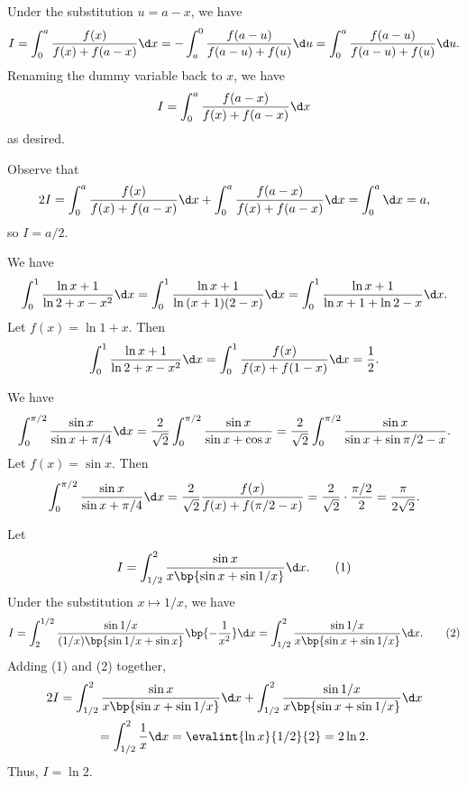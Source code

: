 \begin{solution}
    \begin{ppart}
        Under the substitution $u = a - x$, we have \[I = \int_0^a \frac{f(x)}{f(x) + f(a-x)} \d x = -\int_a^0 \frac{f(a-u)}{f(a-u) + f(u)} \d u = \int_0^a \frac{f(a-u)}{f(a-u) + f(u)} \d u.\] Renaming the dummy variable back to $x$, we have \[I = \int_0^a \frac{f(a - x)}{f(x) + f(a-x)} \d x\] as desired.

        Observe that \[2I = \int_0^a \frac{f(x)}{f(x) + f(a-x)} \d x + \int_0^a \frac{f(a - x)}{f(x) + f(a-x)} \d x = \int_0^a \d x = a,\] so $I = a/2$.

        We have \[\int_0^1 \frac{\ln{x+1}}{\ln{2 + x - x^2}} \d x = \int_0^1 \frac{\ln{x+1}}{\ln{(x+1)(2-x)}} \d x = \int_0^1 \frac{\ln{x+1}}{\ln{x+1} + \ln{2-x}} \d x.\] Let $f(x) = \ln{1+x}$. Then \[\int_0^1 \frac{\ln{x+1}}{\ln{2 + x - x^2}} \d x = \int_0^1 \frac{f(x)}{f(x) + f(1-x)} \d x = \frac12.\]

        We have \[\int_0^{\pi/2} \frac{\sin x}{\sin{x + \pi/4}} \d x = \frac2{\sqrt2} \int_0^{\pi/2} \frac{\sin x}{\sin x + \cos x} = \frac2{\sqrt2} \int_0^{\pi/2} \frac{\sin x}{\sin x + \sin{\pi/2 - x}}.\] Let $f(x) = \sin x$. Then \[\int_0^{\pi/2} \frac{\sin x}{\sin{x + \pi/4}} \d x = \frac2{\sqrt2} \frac{f(x)}{f(x) + f(\pi/2 - x)} = \frac2{\sqrt2} \cdot \frac{\pi/2}{2} = \frac{\pi}{2\sqrt2}.\]
    \end{ppart}
    \begin{ppart}
        Let \[I = \int_{1/2}^{2} \frac{\sin x}{x \bp{\sin x + \sin 1/x}} \d x. \tag{1}\] Under the substitution $x \mapsto 1/x$, we have \[I = \int_{2}^{1/2} \frac{\sin 1/x}{(1/x) \bp{\sin 1/x + \sin x}} \bp{-\frac1{x^2}} \d x = \int_{1/2}^2 \frac{\sin 1/x}{x \bp{\sin x + \sin 1/x}} \d x. \tag{2}\] Adding (1) and (2) together,
        \begin{gather*}
            2I = \int_{1/2}^{2} \frac{\sin x}{x \bp{\sin x + \sin 1/x}} \d x + \int_{1/2}^2 \frac{\sin 1/x}{x \bp{\sin x + \sin 1/x}} \d x\\
            = \int_{1/2}^2 \frac1x \d x = \evalint{\ln x}{1/2}{2} = 2\ln 2.
        \end{gather*}
        Thus, $I = \ln 2$.
    \end{ppart}
\end{solution}

